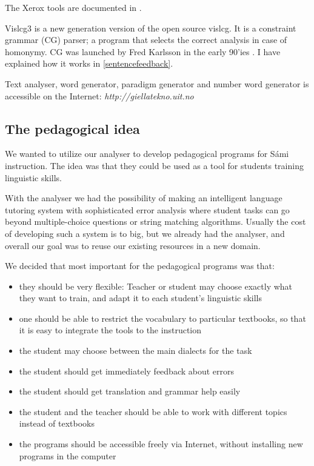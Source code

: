 \documentclass[a4paper,12pt]{article}
\begin{document}
The Xerox tools are documented in \citep{BeesleyKarttunen}. 

Vislcg3 is a new generation version of the open source vislcg. It is a constraint grammar (CG) parser; a program that selects the correct analysis in case of homonymy. CG was launched by Fred Karlsson in the early 90'ies \citep{Karlssonetal1995}. I have explained how it works in \ref{sentencefeedback}.

Text analyser, word generator, paradigm generator and number word generator is accessible on the Internet: \textit{http://giellatekno.uit.no}

\subsection{The pedagogical idea} \label{pedidea}
We wanted to utilize our analyser to develop pedagogical programs for Sámi instruction. The idea was that they could be used as a tool for students training linguistic skills. 

With the analyser we had the possibility of making an intelligent language tutoring system with sophisticated error analysis where student tasks can go beyond multiple-choice questions or string matching algorithms. Usually the cost of developing such a system is to big, but we already had the analyser, and overall our goal was to reuse our existing resources in a new domain.

We decided that most important for the pedagogical programs was that:

\begin{itemize}
\item they should be very flexible: Teacher or student may choose exactly what they want to train, and adapt it to each student's linguistic skills 
\item one should be able to restrict the vocabulary to particular textbooks, so that it is easy to integrate the tools to the instruction
\item the student may choose between the main dialects for the task
\item the student should get immediately feedback about errors
\item the student should get translation and grammar help easily
\item the student and the teacher should be able to work with different topics instead of textbooks
\item the programs should be accessible freely via Internet, without installing new programs in the computer
\end{itemize}
\end{document}
